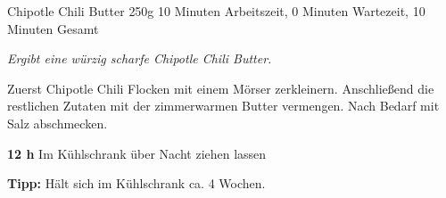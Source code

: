 \begin{recipe}{Chipotle Chili Butter} {250g} {10 Minuten Arbeitszeit, 0 Minuten Wartezeit, 10 Minuten Gesamt}

  \freeform{}\textit{Ergibt eine würzig scharfe Chipotle Chili Butter.}


  Zuerst Chipotle Chili Flocken mit einem Mörser zerkleinern.
  Anschließend die restlichen Zutaten mit der zimmerwarmen Butter vermengen.
  Nach Bedarf mit Salz abschmecken.

  \newstep{}\textbf{12 h}
  Im Kühlschrank über Nacht ziehen lassen

  \freeform{}\hrulefill{}

  \freeform{}\textbf{Tipp:}
  Hält sich im Kühlschrank ca. 4 Wochen.

\end{recipe}
